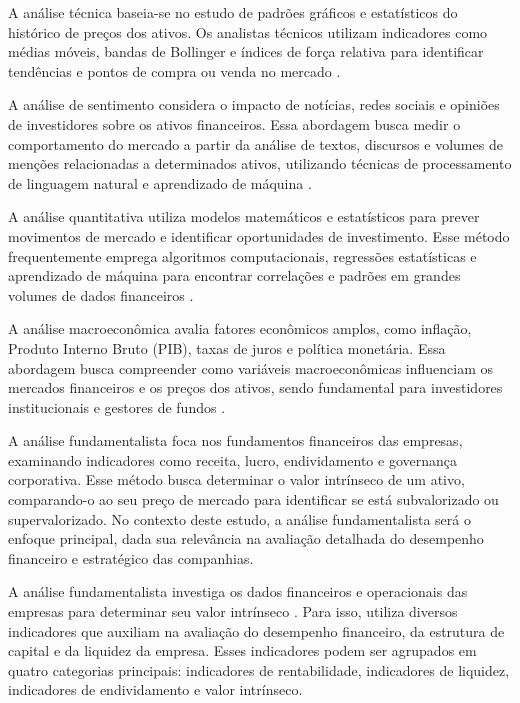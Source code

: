 A análise técnica baseia-se no estudo de padrões gráficos e estatísticos do histórico de preços dos ativos. Os analistas técnicos utilizam indicadores como médias móveis, bandas de Bollinger e índices de força relativa para identificar tendências e pontos de compra ou venda no mercado \cite{omane:2019:time}.  

A análise de sentimento considera o impacto de notícias, redes sociais e opiniões de investidores sobre os ativos financeiros. Essa abordagem busca medir o comportamento do mercado a partir da análise de textos, discursos e volumes de menções relacionadas a determinados ativos, utilizando técnicas de processamento de linguagem natural e aprendizado de máquina \cite{kearney:2014:textual}.  

A análise quantitativa utiliza modelos matemáticos e estatísticos para prever movimentos de mercado e identificar oportunidades de investimento. Esse método frequentemente emprega algoritmos computacionais, regressões estatísticas e aprendizado de máquina para encontrar correlações e padrões em grandes volumes de dados financeiros \cite{sahu:2023:overview}.  

A análise macroeconômica avalia fatores econômicos amplos, como inflação, Produto Interno Bruto (PIB), taxas de juros e política monetária. Essa abordagem busca compreender como variáveis macroeconômicas influenciam os mercados financeiros e os preços dos ativos, sendo fundamental para investidores institucionais e gestores de fundos \cite{claessens:2017:macroeconomic}.  

A análise fundamentalista foca nos fundamentos financeiros das empresas, examinando indicadores como receita, lucro, endividamento e governança corporativa. Esse método busca determinar o valor intrínseco de um ativo, comparando-o ao seu preço de mercado para identificar se está subvalorizado ou supervalorizado. No contexto deste estudo, a análise fundamentalista será o enfoque principal, dada sua relevância na avaliação detalhada do desempenho financeiro e estratégico das companhias.  


A análise fundamentalista investiga os dados financeiros e operacionais das empresas para determinar seu valor intrínseco \cite{mathew:2024:overview}. Para isso, utiliza diversos indicadores que auxiliam na avaliação do desempenho financeiro, da estrutura de capital e da liquidez da empresa. Esses indicadores podem ser agrupados em quatro categorias principais: indicadores de rentabilidade, indicadores de liquidez, indicadores de endividamento e valor intrínseco.

